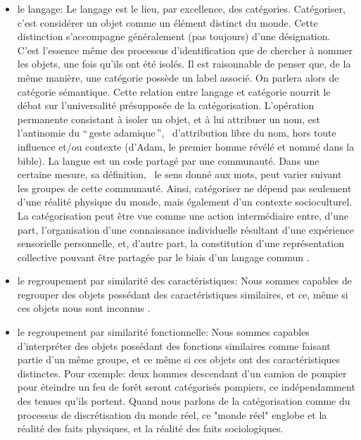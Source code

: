 
\begin{itemize}

\item le langage: Le langage est le lieu, par excellence, des catégories. Catégoriser, c'est considérer un objet comme un élément distinct du monde. Cette distinction s'accompagne généralement (pas toujours) d'une désignation. C'est l'essence même des processus d'identification que de chercher à nommer les objets, une fois qu'ils ont été isolés. Il est raisonnable de penser que, de la même manière, une catégorie possède un label associé. On parlera alors de catégorie sémantique. Cette relation entre langage et catégorie nourrit le débat sur l'universalité présupposée de la catégorisation. L'opération permanente consistant à isoler un objet, et à lui attribuer un nom, est l'antinomie du ``\,geste adamique\,'', \ie~d'attribution libre du nom, hors toute influence et/ou contexte (d'Adam, le premier homme révélé et nommé dans la bible). La langue est un code partagé par une communauté. Dans une certaine mesure, sa définition, \ie~le sens donné aux mots, peut varier suivant les groupes de cette communauté. Ainsi, catégoriser ne dépend pas seulement d'une réalité physique du monde, mais également d'un contexte socioculturel. La catégorisation peut être vue comme une action intermédiaire entre, d'une part, l'organisation d'une connaissance individuelle résultant d'une expérience sensorielle personnelle, et, d'autre part, la constitution d'une représentation collective pouvant être partagée par le biais d'un langage commun \citep{dubois2006cognitive}.
\item le regroupement par similarité des caractéristiques: Nous sommes capables de regrouper des objets possédant des caractéristiques similaires, et ce, même si ces objets nous sont inconnus \citep{fried1984induction}.
\item le regroupement par similarité fonctionnelle: Nous sommes capables d'interpréter des objets possédant des fonctions similaires comme faisant partie d'un même groupe, et ce même si ces objets ont des caractéristiques distinctes. Pour exemple: deux hommes descendant d'un camion de pompier pour éteindre un feu de forêt seront catégorisés pompiers, ce indépendamment des tenues qu'ils portent. Quand nous parlons de la catégorisation comme du processus de discrétisation du monde réel, ce "monde réel" englobe et la réalité des faits physiques, et la réalité des faits sociologiques.
\end{itemize}

